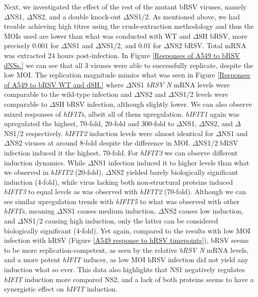Next, we investigated the effect of the rest of the mutant bRSV viruses, namely \(\Delta\)NS1, \(\Delta\)NS2, and a double knock-out \(\Delta\)NS1/2. As mentioned above, we had trouble achieving high titres using the crude-extraction methodology and thus the MOIs used are lower than what was conducted with WT and \(\Delta\)SH bRSV, more precisely 0.001 for \(\Delta\)NS1 and \(\Delta\)NS1/2, and 0.01 for \(\Delta\)NS2 bRSV. Total mRNA was extracted 24 hours post-infection. In Figure \ref{Responses of A549 to bRSV dNSs.} we can see that all 3 viruses were able to successfully replicate, despite the low MOI. The replication magnitude mimics what was seen in Figure \ref{Responses of A549 to bRSV WT and dSH.} where \(\Delta\)NS1 \textit{bRSV N} mRNA levels were comparable to the wild-type infection and \(\Delta\)NS2 and \(\Delta\)NS1/2 levels were comparable to \(\Delta\)SH bRSV infection, although slightly lower. We can also observe mixed responses of \textit{hIFITs}, albeit all of them upregulation. \textit{hIFIT1} again was upregulated the highest, 70-fold, 20-fold and 300-fold to \(\Delta\)NS1, \(\Delta\)NS2, and \(\Delta\)NS1/2 respectively. \textit{hIFIT2} induction levels were almost identical for \(\Delta\)NS1 and \(\Delta\)NS2 viruses at around 8-fold despite the difference in MOI. \(\Delta\)NS1/2 bRSV infection induced it the highest, 70-fold. For \textit{hIFIT3} we can observe different induction dynamics. While \(\Delta\)NS1 infection induced it to higher levels than what we observed in \textit{hIFIT2} (20-fold), \(\Delta\)NS2 yielded barely biologically significant induction (4-fold), while virus lacking both non-structural proteins induced \textit{hIFIT3} to equal levels as was observed with \textit{hIFIT2} (70-fold). Although we can see similar upregulation trends with \textit{hIFIT5} to what was observed with other \textit{hIFITs}, meaning \(\Delta\)NS1 causes medium induction, \(\Delta\)NS2 causes low induction, and \(\Delta\)NS1/2 causing high induction, only the latter can be considered biologically significant (4-fold). Yet again, compared to the results with low MOI infection with hRSV (Figure \ref{A549 response to hRSV timepoints}), bRSV seems to be more replication-competent, as seen by the relative \textit{bRSV N} mRNA levels, and a more potent \textit{hIFIT} inducer, as low MOI hRSV infection did not yield any induction what so ever. This data also highlights that NS1 negatively regulates \textit{hIFIT} induction more compared NS2, and a lack of both proteins seems to have a synergistic effect on \textit{hIFIT} induction.


